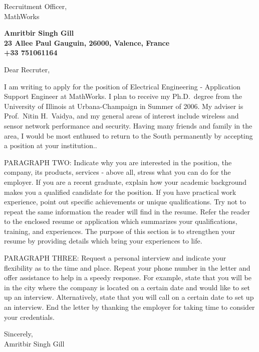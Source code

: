 \documentclass[11pt]{letter}
\begin{document}
\begin{letter}{Recruitment Officer, \\
MathWorks} 

\begin{center}
\large\bf {Amritbir Singh Gill} \\
23 Allee Paul Gauguin, 26000, Valence, France \\ +33 751061164
\end{center} 

\opening{Dear Recruter,} 
 
I am writing to apply for the position of Electrical Engineering - Application Support Engineer at MathWorks.  I plan to receive my
Ph.D.\ degree from the University of Illinois at
Urbana-Champaign in Summer of 2006.  My adviser is
Prof.\ Nitin H.\ Vaidya, and my general areas of interest
include wireless and sensor network performance and security.
 Having many friends and family in the area, I would be
most enthused to return to the South permanently by accepting
a position at your institution..

PARAGRAPH TWO: Indicate why you are interested in the position, the company, its products, services - above all, stress what you can do for the employer. If you are a recent graduate, explain how your academic background makes you a qualified candidate for the position. If you have practical work experience, point out specific achievements or unique qualifications. Try not to repeat the same information the reader will find in the resume. Refer the reader to the enclosed resume or application which summarizes your qualifications, training, and experiences. The purpose of this section is to strengthen your resume by providing details which bring your experiences to life. 
 
PARAGRAPH THREE: Request a personal interview and indicate your flexibility as to the time and place. Repeat your phone number in the letter and offer assistance to help in a speedy response. For example, state that you will be in the city where the company is located on a certain date and would like to set up an interview. Alternatively, state that you will call on a certain date to set up an interview. End the letter by thanking the employer for taking time to consider your credentials. 

\closing{Sincerely, \\ Amritbir Singh Gill}

\end{letter}
\end{document}
